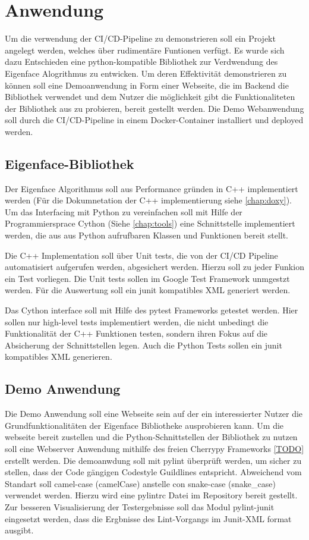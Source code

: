 \chapter{Anwendung}

Um die verwendung der \ac{CI/CD}-Pipeline zu demonstrieren soll ein Projekt angelegt werden, welches über rudimentäre Funtionen verfügt.
Es wurde sich dazu Entschieden eine python-kompatible Bibliothek zur Verdwendung des Eigenface Alogrithmus zu entwicken. Um deren Effektivität demonstrieren zu können soll eine Demoanwendung in Form einer Webseite, die im Backend die Bibliothek verwendet und dem Nutzer die möglichkeit gibt die Funktionaliteten der Bibliothek aus zu probieren, bereit gestellt werden. Die Demo Webanwendung soll durch die \ac{CI/CD}-Pipeline in einem Docker-Container installiert und deployed werden.

\section{Eigenface-Bibliothek}

Der Eigenface Algorithmus soll aus Performance gründen in C++ implementiert werden (Für die Dokumnetation der C++ implementierung siehe \autoref{chap:doxy}). Um das Interfacing mit Python zu vereinfachen soll mit Hilfe der Programmiersprace Cython (Siehe \autoref{chap:tools}) eine Schnittstelle implementiert werden, die aus aus Python aufrufbaren Klassen und Funktionen bereit stellt.

Die C++ Implementation soll über Unit tests, die von der CI/CD Pipeline automatisiert aufgerufen werden, abgesichert werden. Hierzu soll zu jeder Funkion ein Test vorliegen. Die Unit tests sollen im Google Test Framework unmgestzt werden. Für die Auswertung soll ein junit kompatibles XML generiert werden.

Das Cython interface soll mit Hilfe des pytest Frameworks getestet werden. Hier sollen nur high-level tests implementiert werden, die nicht unbedingt die Funktionalität der C++ Funktionen testen, sondern ihren Fokus auf die Absicherung der Schnittstellen legen. Auch die Python Tests sollen ein junit kompatibles XML generieren.

\section {Demo Anwendung}

Die Demo Anwendung soll eine Webseite sein auf der ein interessierter Nutzer die Grundfunktionalitäten der Eigenface Bibliotheke ausprobieren kann. Um die webseite bereit zustellen und die Python-Schnittstellen der Bibliothek zu nutzen soll eine Webserver Anwendung mithilfe des freien Cherrypy Frameworks \ref{TODO} erstellt werden.
Die demoanwdung soll mit pylint überprüft werden, um sicher zu stellen, dass der Code gängigen Codestyle Guildlines entspricht. Abweichend vom Standart soll camel-case (camelCase) anstelle con snake-case (snake\_case) verwendet werden. Hierzu wird eine pylintrc Datei im Repository bereit gestellt. Zur besseren Visualisierung der Testergebnisse soll das Modul pylint-junit eingesetzt werden, dass die Ergbnisse des Lint-Vorgangs im Junit-XML format ausgibt.
